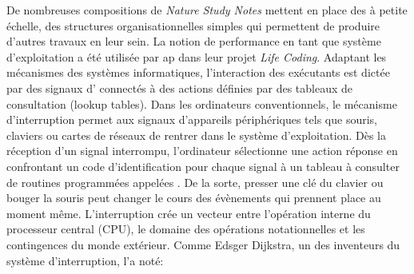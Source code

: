{De nombreuses compositions de {\em Nature Study Notes} mettent en
place des  \`a petite \'echelle, des
structures organisationnelles simples qui permettent de produire
d'autres travaux en leur sein. La notion de performance en tant que
syst\`eme d'exploitation a \'et\'e utilis\'ee par ap dans leur projet
{\em Life Coding}. Adaptant les m\'ecanismes des syst\`emes
informatiques, l'interaction des ex\'ecutants est dict\'ee par des
signaux d'  connect\'es \`a des actions d\'efinies par
des tableaux de consultation (lookup tables). Dans les ordinateurs
conventionnels, le m\'ecanisme d'interruption permet aux signaux
d'appareils p\'eriph\'eriques tels que souris, claviers ou cartes de
r\'eseaux de rentrer dans le syst\`eme d'exploitation. D\`es la
r\'eception d'un signal interrompu, l'ordinateur s\'electionne une
action r\'eponse en confrontant un code d'identification pour chaque
signal \`a un tableau \`a consulter de routines programm\'ees
appel\'ees . De la sorte, presser une cl\'e du
clavier ou bouger la souris peut changer le cours des \'ev\`enements
qui prennent place au moment m\^eme. L'interruption cr\'ee un vecteur
entre l'op\'eration interne du processeur central (CPU), le domaine des
op\'erations notationnelles et les contingences du monde ext\'erieur.
Comme Edsger Dijkstra, un des inventeurs du syst\`eme d'interruption,
l'a not\'e:



}
